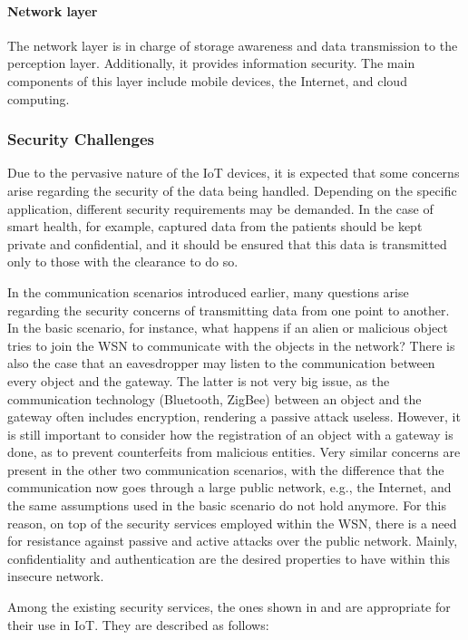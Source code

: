 \documentclass[12pt]{article}
\begin{document}
\paragraph{Network layer} The network layer is in charge of storage awareness and data transmission to the perception layer. Additionally, it provides information security. The main components of this layer include mobile devices, the Internet, and cloud computing.

\subsubsection{Security Challenges}

Due to the pervasive nature of the IoT devices, it is expected that some concerns arise regarding the security of the data being handled. Depending on the specific application, different security requirements may be demanded. In the case of smart health, for example, captured data from the patients should be kept private and confidential, and it should be ensured that this data is transmitted only to those with the clearance to do so.

In the communication scenarios introduced earlier, many questions arise regarding the security concerns of transmitting data from one point to another. In the basic scenario, for instance, what happens if an alien or malicious object tries to join the WSN to communicate with the objects in the network? There is also the case that an eavesdropper may listen to the communication between every object and the gateway. The latter is not very big issue, as the communication technology (Bluetooth, ZigBee) between an object and the gateway often includes encryption, rendering a passive attack useless. However, it is still important to consider how the registration of an object with a gateway is done, as to prevent counterfeits from malicious entities. Very similar concerns are present in the other two communication scenarios, with the difference that the communication now goes through a large public network, e.g., the Internet, and the same assumptions used in the basic scenario do not hold anymore. For this reason, on top of the security services employed within the WSN, there is a need for resistance against passive and active attacks over the public network. Mainly, confidentiality and authentication are the desired properties to have within this insecure network.

Among the existing security services, the ones shown in  \cite{HELLAOUI2017173} and \cite{ALABA201710} are appropriate for their use in IoT. They are described as follows: 
\end{document}
